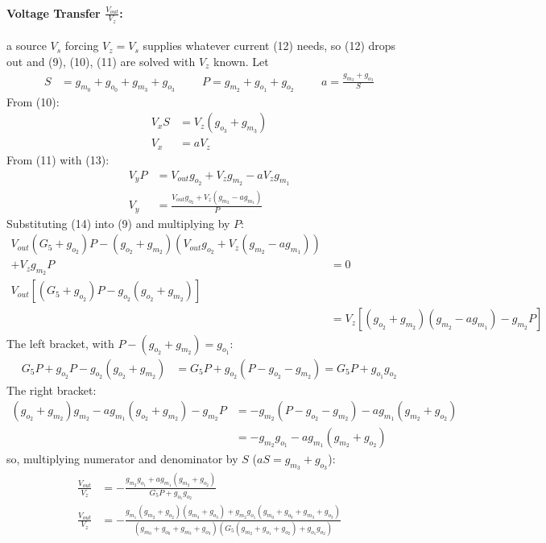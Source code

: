\begin{enumerate}
    \paragraph{Voltage Transfer \(\frac{V_{out}}{V_z}\):} a source \(V_s\) forcing \(V_z = V_s\)
    supplies whatever current (12) needs, so (12) drops out and (9), (10),
    (11) are solved with \(V_z\) known. Let
    \begin{align*}
      S &= g_{m_0} + g_{o_0} + g_{m_3} + g_{o_3} \hspace{1cm} P = g_{m_2} + g_{o_1} + g_{o_2} \hspace{1cm} a = \frac{g_{m_3} + g_{o_3}}{S}
    \end{align*}
    From (10):
    \begin{align*}
      V_x S &= V_z (g_{o_3} + g_{m_3}) \\
      V_x &= a V_z \tag{13}
    \end{align*}
    From (11) with (13):
    \begin{align*}
      V_y P &= V_{out} g_{o_2} + V_z g_{m_2} - a V_z g_{m_1} \\
      V_y &= \frac{V_{out} g_{o_2} + V_z (g_{m_2} - a g_{m_1})}{P} \tag{14}
    \end{align*}
    Substituting (14) into (9) and multiplying by \(P\):
    \begin{align*}
      V_{out}(G_5 + g_{o_2}) P - (g_{o_2} + g_{m_2})\left(V_{out} g_{o_2} + V_z (g_{m_2} - a g_{m_1})\right) \\
      + V_z g_{m_2} P &= 0 \\
      V_{out}\left[(G_5 + g_{o_2}) P - g_{o_2}(g_{o_2} + g_{m_2})\right] \\
      &= V_z\left[(g_{o_2} + g_{m_2})(g_{m_2} - a g_{m_1}) - g_{m_2} P\right]
    \end{align*}
    The left bracket, with \(P - (g_{o_2} + g_{m_2}) = g_{o_1}\):
    \begin{align*}
      G_5 P + g_{o_2} P - g_{o_2}(g_{o_2} + g_{m_2}) &= G_5 P + g_{o_2}\left(P - g_{o_2} - g_{m_2}\right) = G_5 P + g_{o_1} g_{o_2}
    \end{align*}
    The right bracket:
    \begin{align*}
      (g_{o_2} + g_{m_2}) g_{m_2} - a g_{m_1}(g_{o_2} + g_{m_2}) - g_{m_2} P
        &= -g_{m_2}\left(P - g_{o_2} - g_{m_2}\right) - a g_{m_1}(g_{m_2} + g_{o_2}) \\
        &= -g_{m_2} g_{o_1} - a g_{m_1}(g_{m_2} + g_{o_2})
    \end{align*}
    so, multiplying numerator and denominator by \(S\) (\(aS = g_{m_3} + g_{o_3}\)):
    \begin{align*}
      \frac{V_{out}}{V_z} &= -\frac{g_{m_2} g_{o_1} + a g_{m_1}(g_{m_2} + g_{o_2})}{G_5 P + g_{o_1} g_{o_2}} \\
      \frac{V_{out}}{V_z} &= -\frac{g_{m_1}(g_{m_2} + g_{o_2})(g_{m_3} + g_{o_3}) + g_{m_2} g_{o_1}(g_{m_0} + g_{o_0} + g_{m_3} + g_{o_3})}{(g_{m_0} + g_{o_0} + g_{m_3} + g_{o_3})\left(G_5 (g_{m_2} + g_{o_1} + g_{o_2}) + g_{o_1} g_{o_2}\right)}
    \end{align*}

\end{enumerate}
